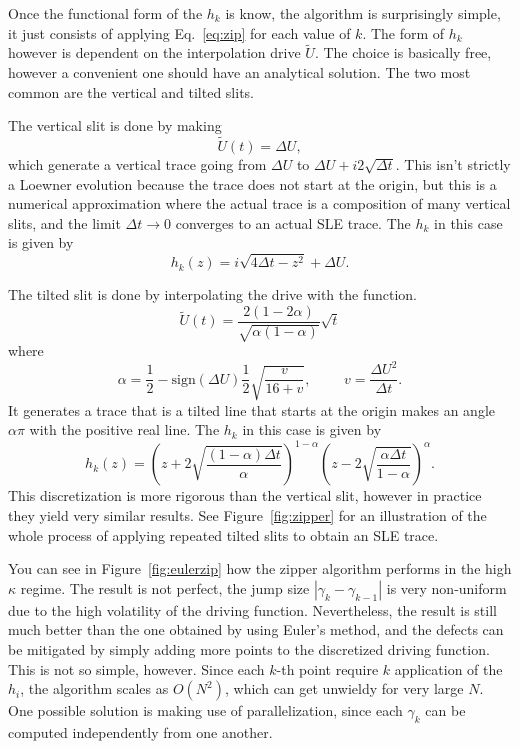 Once the functional form of the $h_k$ is know, the algorithm is surprisingly
simple, it just consists of applying Eq.~\ref{eq:zip} for each value of $k$.
The form of $h_k$ however is dependent on the interpolation drive $\tilde{U}$.
The choice is basically free, however a convenient one should have an
analytical solution. The two most common are the vertical and tilted slits.

The vertical slit is done by making
\begin{equation}
    \tilde{U}(t)=\Delta U,
\end{equation}
which generate a vertical trace going from $\Delta U$ to $\Delta U +
i2\sqrt{\Delta t}$. This isn't strictly a Loewner evolution because the trace
does not start at the origin, but this is a numerical approximation where the
actual trace is a composition of many vertical slits, and the limit $\Delta t
\rightarrow 0$ converges to an actual SLE trace. The $h_k$ in this case is
given by
\begin{equation}
    \label{eq:vslit}
    h_{k}(z)=i\sqrt{4\Delta t-z^{2}}+\Delta U.
\end{equation}

The tilted slit is done by interpolating the drive with the function.
\begin{equation}
    \tilde{U}(t)=
        \frac{2\left(1-2\alpha\right)}
             {\sqrt{\alpha\left(1-\alpha\right)}}
        \sqrt{t}
\end{equation}
where
\begin{equation}
    \alpha=\frac{1}{2}-
    \mbox{sign}\left(\Delta U\right)\frac{1}{2}\sqrt{\frac{v}{16+v}},
    \,\,\,\,\,\,\,\,\,\,\,\,\,\,
    v=\frac{\Delta U^{2}}{\Delta t}.
\end{equation}
It generates a trace that is a tilted line that starts at the origin makes an
angle $\alpha\pi$ with the positive real line. The $h_k$ in this case is
given by
\begin{equation}
    h_{k}(z) = 
    {\left(
        z+2\sqrt{\frac{\left(1-\alpha\right)\Delta t}{\alpha}}
    \right)}^{1-\alpha}
    {\left(
        z-2\sqrt{\frac{\alpha\Delta t}{1-\alpha}}
    \right)}^{\alpha}.
\end{equation}
This discretization is more rigorous than the vertical slit, however in
practice they yield very similar results. See Figure~\ref{fig:zipper} for an
illustration of the whole process of applying repeated tilted slits to obtain
an SLE trace.

You can see in Figure~\ref{fig:eulerzip} how the zipper algorithm performs in
the high $\kappa$ regime. The result is not perfect, the jump size
$\left|\gamma_{k}-\gamma_{k-1}\right|$ is very non-uniform due to the high
volatility of the driving function. Nevertheless, the result is still much
better than the one obtained by using Euler's method, and the defects can be
mitigated by simply adding more points to the discretized driving function.
This is not so simple, however. Since each $k$-th point require $k$ application
of the $h_i$, the algorithm scales as $O(N^2)$, which can get unwieldy
for very large $N$. One possible solution is making use of parallelization,
since each $\gamma_k$ can be computed independently from one another.

